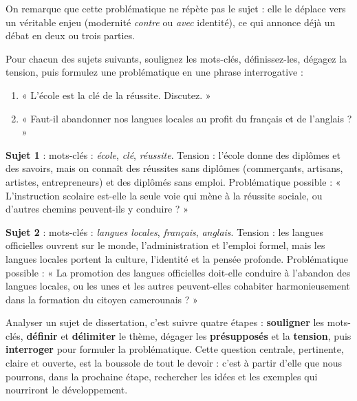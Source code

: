 \documentclass[11pt]{article}
\newcounter{popsec}
\newcounter{popsub}
\newcommand{\courssub}[1]{%
  \stepcounter{popsub}%
  \par\vspace{9pt}\noindent{\popxbold\fontsize{11.5}{13}\selectfont\color{popink}{\color{poporange}\thepopsec.\thepopsub}\hspace{6pt}#1}\par\nopagebreak\vspace{4pt}
}
\begin{document}
On remarque que cette problématique ne répète pas le sujet : elle le déplace vers un véritable enjeu (modernité \emph{contre} ou \emph{avec} identité), ce qui annonce déjà un débat en deux ou trois parties.

\courssub{Entraînement}

\begin{exercice}
Pour chacun des sujets suivants, soulignez les mots-clés, définissez-les, dégagez la tension, puis formulez une problématique en une phrase interrogative :
\begin{enumerate}
\item « L'école est la clé de la réussite. Discutez. »
\item « Faut-il abandonner nos langues locales au profit du français et de l'anglais ? »
\end{enumerate}
\end{exercice}

\begin{corrige}[Exercice]
\textbf{Sujet 1} : mots-clés : \emph{école}, \emph{clé}, \emph{réussite}. Tension : l'école donne des diplômes et des savoirs, mais on connaît des réussites sans diplômes (commerçants, artisans, artistes, entrepreneurs) et des diplômés sans emploi. Problématique possible : « L'instruction scolaire est-elle la seule voie qui mène à la réussite sociale, ou d'autres chemins peuvent-ils y conduire ? »

\textbf{Sujet 2} : mots-clés : \emph{langues locales}, \emph{français}, \emph{anglais}. Tension : les langues officielles ouvrent sur le monde, l'administration et l'emploi formel, mais les langues locales portent la culture, l'identité et la pensée profonde. Problématique possible : « La promotion des langues officielles doit-elle conduire à l'abandon des langues locales, ou les unes et les autres peuvent-elles cohabiter harmonieusement dans la formation du citoyen camerounais ? »
\end{corrige}

\begin{aretenir}
Analyser un sujet de dissertation, c'est suivre quatre étapes : \textbf{souligner} les mots-clés, \textbf{définir} et \textbf{délimiter} le thème, dégager les \textbf{présupposés} et la \textbf{tension}, puis \textbf{interroger} pour formuler la problématique. Cette question centrale, pertinente, claire et ouverte, est la boussole de tout le devoir : c'est à partir d'elle que nous pourrons, dans la prochaine étape, rechercher les idées et les exemples qui nourriront le développement.
\end{aretenir}
\end{document}

